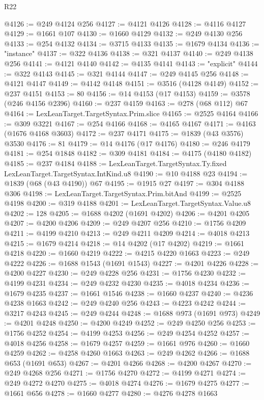 \begin{lexlean}{R22}
\begin{coremodule}
@4126 := @249 @4124 @256
@4127 := @4121 @4126
@4128 := @4116 @4127
@4129 := @1661 @107
@4130 := @1660 @4129
@4132 := @249 @4130 @256
@4133 := @254 @4132
@4134 := @3715 @4133
@4135 := @1679 @4134
@4136 := "instance"
@4137 := @322 @4136
@4138 := @321 @4137
@4140 := @249 @4138 @256
@4141 := @4121 @4140
@4142 := @4135 @4141
@4143 := "explicit"
@4144 := @322 @4143
@4145 := @321 @4144
@4147 := @249 @4145 @256
@4148 := @4121 @4147
@4149 := @4142 @4148
@4151 := @3516 (@4128 @4149)
@4152 := @237 @4151
@4153 := 80
@4156 := @14 @4153 (@17 @4153)
@4159 := @3578 (@246 @4156 @2396)
@4160 := @237 @4159
@4163 := @278 (@68 @112) @67
@4164 := LexLeanTarget.TargetSyntax.Prim.slice
@4165 := @2525 @4164
@4166 := @309 @3221
@4167 := @254 @4166
@4168 := @4165 @4167
@4171 := @4163 (@1676 @4168 @3603)
@4172 := @237 @4171
@4175 := @1839 (@43 @3576) @3530
@4176 := 81
@4179 := @14 @4176 (@17 @4176)
@4180 := @246 @4179
@4181 := @254 @1848
@4182 := @309 @4181
@4184 := @4175 (@4180 @4182)
@4185 := @237 @4184
@4188 := LexLeanTarget.TargetSyntax.Ty.fixed LexLeanTarget.TargetSyntax.IntKind.u8
@4190 := @10 @4188 @23
@4194 := @1839 (@68 (@43 @4190)) @67
@4195 := @1915 @27
@4197 := @304 @4188 @306
@4198 := LexLeanTarget.TargetSyntax.Prim.bitAnd
@4199 := @2525 @4198
@4200 := @319 @4188
@4201 := LexLeanTarget.TargetSyntax.Value.u8
@4202 := 128
@4205 := @1688 @4202 (@1691 @4202)
@4206 := @4201 @4205
@4207 := @4200 @4206
@4209 := @249 @4207 @256
@4210 := @1756 @4209
@4211 := @4199 @4210
@4213 := @249 @4211 @4209
@4214 := @4018 @4213
@4215 := @1679 @4214
@4218 := @14 @4202 (@17 @4202)
@4219 := @1661 @4218
@4220 := @1660 @4219
@4222 := @4215 @4220 @1663
@4223 := @249 @4222
@4226 := @1688 @1543 (@1691 @1543)
@4227 := @4201 @4226
@4228 := @4200 @4227
@4230 := @249 @4228 @256
@4231 := @1756 @4230
@4232 := @4199 @4231
@4234 := @249 @4232 @4230
@4235 := @4018 @4234
@4236 := @1679 @4235
@4237 := @1661 @1546
@4238 := @1660 @4237
@4240 := @4236 @4238 @1663
@4242 := @249 @4240 @256
@4243 := @4223 @4242
@4244 := @3217 @4243
@4245 := @249 @4244
@4248 := @1688 @973 (@1691 @973)
@4249 := @4201 @4248
@4250 := @4200 @4249
@4252 := @249 @4250 @256
@4253 := @1756 @4252
@4254 := @4199 @4253
@4256 := @249 @4254 @4252
@4257 := @4018 @4256
@4258 := @1679 @4257
@4259 := @1661 @976
@4260 := @1660 @4259
@4262 := @4258 @4260 @1663
@4263 := @249 @4262
@4266 := @1688 @653 (@1691 @653)
@4267 := @4201 @4266
@4268 := @4200 @4267
@4270 := @249 @4268 @256
@4271 := @1756 @4270
@4272 := @4199 @4271
@4274 := @249 @4272 @4270
@4275 := @4018 @4274
@4276 := @1679 @4275
@4277 := @1661 @656
@4278 := @1660 @4277
@4280 := @4276 @4278 @1663

\end{coremodule}
\end{lexlean}
